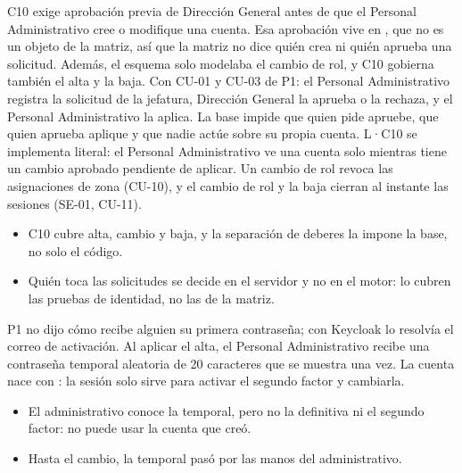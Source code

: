 \documentclass[11pt,a4paper]{article}
\theoremstyle{definition}
\theoremstyle{remark}
\begin{document}
\adrctx C10 exige aprobación previa de Dirección General antes de que el
Personal Administrativo cree o modifique una cuenta. Esa aprobación vive en
, que no es un objeto de la matriz, así que la matriz
no dice quién crea ni quién aprueba una solicitud. Además, el esquema solo
modelaba el cambio de rol, y C10 gobierna también el alta y la baja.
\adrdec Con CU-01 y CU-03 de P1: el Personal Administrativo registra la
solicitud de la jefatura, Dirección General la aprueba o la rechaza, y el
Personal Administrativo la aplica. La base impide que quien pide apruebe, que
quien aprueba aplique y que nadie actúe sobre su propia cuenta. L·C10 se
implementa literal: el Personal Administrativo ve una cuenta solo mientras
tiene un cambio aprobado pendiente de aplicar. Un cambio de rol revoca las
asignaciones de zona (CU-10), y el cambio de rol y la baja cierran al
instante las sesiones (SE-01, CU-11).
\adrpos
\begin{itemize}
  \item C10 cubre alta, cambio y baja, y la separación de deberes la impone la
    base, no solo el código.
\end{itemize}
\adrneg
\begin{itemize}
  \item Quién toca las solicitudes se decide en el servidor y no en el motor:
    lo cubren las pruebas de identidad, no las de la matriz.
\end{itemize}

\adrctx P1 no dijo cómo recibe alguien su primera contraseña; con Keycloak lo
resolvía el correo de activación.
\adrdec Al aplicar el alta, el Personal Administrativo recibe una contraseña
temporal aleatoria de 20 caracteres que se muestra una vez. La cuenta nace
con : la sesión solo sirve para activar el segundo factor
y cambiarla.
\adrpos
\begin{itemize}
  \item El administrativo conoce la temporal, pero no la definitiva ni el
    segundo factor: no puede usar la cuenta que creó.
\end{itemize}
\adrneg
\begin{itemize}
  \item Hasta el cambio, la temporal pasó por las manos del administrativo.
\end{itemize}
\end{document}
